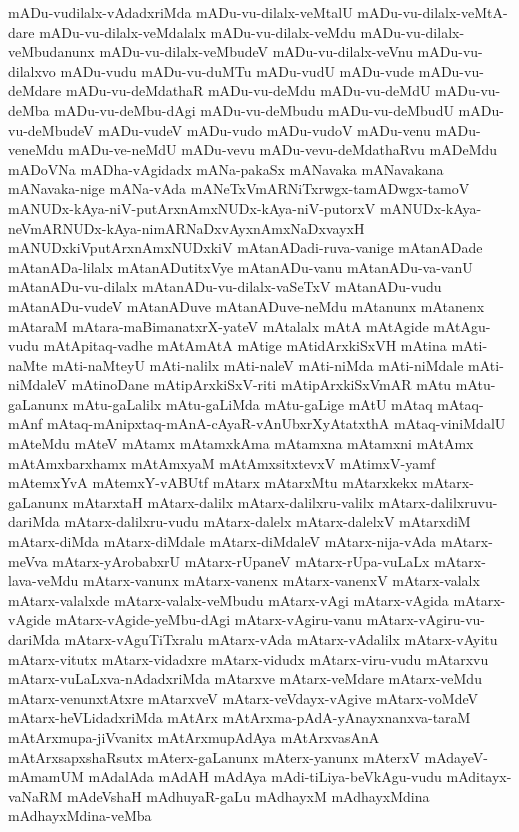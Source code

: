 {mADu-vudilalx-vAdadxriMda
mADu-vu-dilalx-veMtalU
mADu-vu-dilalx-veMtA-dare
mADu-vu-dilalx-veMdalalx
mADu-vu-dilalx-veMdu
mADu-vu-dilalx-veMbudanunx
mADu-vu-dilalx-veMbudeV
mADu-vu-dilalx-veVnu
mADu-vu-dilalxvo
mADu-vudu
mADu-vu-duMTu
mADu-vudU
mADu-vude
mADu-vu-deMdare
mADu-vu-deMdathaR
mADu-vu-deMdu
mADu-vu-deMdU
mADu-vu-deMba
mADu-vu-deMbu-dAgi
mADu-vu-deMbudu
mADu-vu-deMbudU
mADu-vu-deMbudeV
mADu-vudeV
mADu-vudo
mADu-vudoV
mADu-venu
mADu-veneMdu
mADu-ve-neMdU
mADu-vevu
mADu-vevu-deMdathaRvu
mADeMdu
mADoVNa
mADha-vAgidadx
mANa-pakaSx
mANavaka
mANavakana
mANavaka-nige
mANa-vAda
mANeTxVmARNiTxrwgx-tamADwgx-tamoV
mANUDx-kAya-niV-putArxnAmxNUDx-kAya-niV-putorxV
mANUDx-kAya-neVmARNUDx-kAya-nimARNaDxvAyxnAmxNaDxvayxH
mANUDxkiVputArxnAmxNUDxkiV
mAtanADadi-ruva-vanige
mAtanADade
mAtanADa-lilalx
mAtanADutitxVye
mAtanADu-vanu
mAtanADu-va-vanU
mAtanADu-vu-dilalx
mAtanADu-vu-dilalx-vaSeTxV
mAtanADu-vudu
mAtanADu-vudeV
mAtanADuve
mAtanADuve-neMdu
mAtanunx
mAtanenx
mAtaraM
mAtara-maBimanatxrX-yateV
mAtalalx
mAtA
mAtAgide
mAtAgu-vudu
mAtApitaq-vadhe
mAtAmAtA
mAtige
mAtidArxkiSxVH
mAtina
mAti-naMte
mAti-naMteyU
mAti-nalilx
mAti-naleV
mAti-niMda
mAti-niMdale
mAti-niMdaleV
mAtinoDane
mAtipArxkiSxV-riti
mAtipArxkiSxVmAR
mAtu
mAtu-gaLanunx
mAtu-gaLalilx
mAtu-gaLiMda
mAtu-gaLige
mAtU
mAtaq
mAtaq-mAnf
mAtaq-mAnipxtaq-mAnA-cAyaR-vAnUbxrXyAtatxthA
mAtaq-viniMdalU
mAteMdu
mAteV
mAtamx
mAtamxkAma
mAtamxna
mAtamxni
mAtAmx
mAtAmxbarxhamx
mAtAmxyaM
mAtAmxsitxtevxV
mAtimxV-yamf
mAtemxYvA
mAtemxY-vABUtf
mAtarx
mAtarxMtu
mAtarxkekx
mAtarx-gaLanunx
mAtarxtaH
mAtarx-dalilx
mAtarx-dalilxru-valilx
mAtarx-dalilxruvu-dariMda
mAtarx-dalilxru-vudu
mAtarx-dalelx
mAtarx-dalelxV
mAtarxdiM
mAtarx-diMda
mAtarx-diMdale
mAtarx-diMdaleV
mAtarx-nija-vAda
mAtarx-meVva
mAtarx-yArobabxrU
mAtarx-rUpaneV
mAtarx-rUpa-vuLaLx
mAtarx-lava-veMdu
mAtarx-vanunx
mAtarx-vanenx
mAtarx-vanenxV
mAtarx-valalx
mAtarx-valalxde
mAtarx-valalx-veMbudu
mAtarx-vAgi
mAtarx-vAgida
mAtarx-vAgide
mAtarx-vAgide-yeMbu-dAgi
mAtarx-vAgiru-vanu
mAtarx-vAgiru-vu-dariMda
mAtarx-vAguTiTxralu
mAtarx-vAda
mAtarx-vAdalilx
mAtarx-vAyitu
mAtarx-vitutx
mAtarx-vidadxre
mAtarx-vidudx
mAtarx-viru-vudu
mAtarxvu
mAtarx-vuLaLxva-nAdadxriMda
mAtarxve
mAtarx-veMdare
mAtarx-veMdu
mAtarx-venunxtAtxre
mAtarxveV
mAtarx-veVdayx-vAgive
mAtarx-voMdeV
mAtarx-heVLidadxriMda
mAtArx
mAtArxma-pAdA-yAnayxnanxva-taraM
mAtArxmupa-jiVvanitx
mAtArxmupAdAya
mAtArxvasAnA
mAtArxsapxshaRsutx
mAterx-gaLanunx
mAterx-yanunx
mAterxV
mAdayeV-mAmamUM
mAdalAda
mAdAH
mAdAya
mAdi-tiLiya-beVkAgu-vudu
mAditayx-vaNaRM
mAdeVshaH
mAdhuyaR-gaLu
mAdhayxM
mAdhayxMdina
mAdhayxMdina-veMba
}
